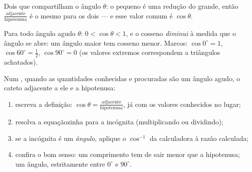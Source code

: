 \begin{omfigure}

{\small Dois  que compartilham o ângulo $\theta$:
o pequeno é uma redução do grande, então
$\frac{\text{adjacente}}{\text{hipotenusa}}$ é o mesmo para os dois ---
e esse valor comum é $\cos\theta$.}
\end{omfigure}

\begin{proposition}\label{prop:g8:cosine:bounds}
Para todo ângulo agudo $\theta$: $0 < \cos\theta < 1$, e o cosseno
\emph{diminui} à medida que o ângulo se abre: um ângulo maior tem
cosseno menor. Marcos: $\cos 0^\circ = 1$,
$\cos 60^\circ = \frac12$, $\cos 90^\circ = 0$ (os valores extremos
correspondem a triângulos achatados).
\end{proposition}
\admitted

\begin{method}\label{met:g8:cosine:use}
Num , quando as quantidades conhecidas e procuradas
são um ângulo agudo, o cateto adjacente a ele e a hipotenusa:
\begin{enumerate}
  \item escreva a definição:
        $\cos\theta = \frac{\text{adjacente}}{\text{hipotenusa}}$, já
        com os valores conhecidos no lugar;
  \item resolva a equaçãozinha para a incógnita (multiplicando ou
        dividindo);
  \item se a incógnita é um \emph{ângulo}, aplique o $\cos^{-1}$ da
        calculadora à razão calculada;
  \item confira o bom senso: um comprimento tem de sair menor que a
        hipotenusa; um ângulo, estritamente entre $0^\circ$ e
        $90^\circ$.
\end{enumerate}
\end{method}

